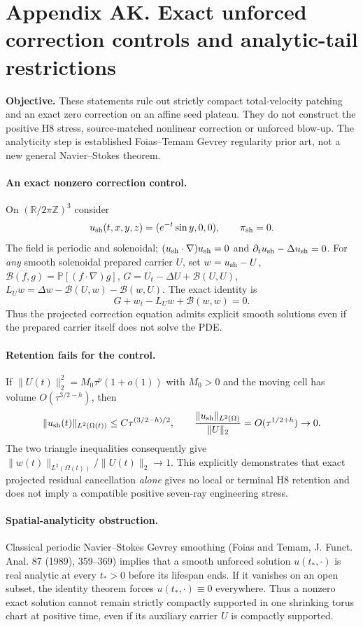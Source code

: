 \clearpage
\section*{Appendix AK. Exact unforced correction controls and analytic-tail restrictions}
\noindent\textbf{Objective.} These statements rule out strictly compact total-velocity patching and an exact zero correction on an affine seed plateau. They do not construct the positive H8 stress, source-matched nonlinear correction or unforced blow-up. The analyticity step is established Foias--Temam Gevrey regularity prior art, not a new general Navier--Stokes theorem.

\paragraph{An exact nonzero correction control.}
On $(\mathbb R/2\pi\mathbb Z)^3$ consider
\[
u_{\rm sh}(t,x,y,z)=(e^{-t}\sin y,0,0),\qquad \pi_{\rm sh}=0.
\]
The field is periodic and solenoidal; $(u_{\rm sh}\cdot\nabla)u_{\rm sh}=0$ and $\partial_tu_{\rm sh}-\Delta u_{\rm sh}=0$. For \emph{any} smooth solenoidal prepared carrier $U$, set $w=u_{\rm sh}-U$, $\mathcal B(f,g)=\mathbb P[(f\cdot\nabla)g]$,
$G=U_t-\Delta U+\mathcal B(U,U)$, $L_Uw=\Delta w-\mathcal B(U,w)-\mathcal B(w,U)$. The exact identity is
\[
\boxed{G+w_t-L_Uw+\mathcal B(w,w)=0.}
\]
Thus the projected correction equation admits explicit smooth solutions even if the prepared carrier itself does not solve the PDE.

\paragraph{Retention fails for the control.}
If $\|U(t)\|_2^2=M_0\tau^{p}(1+o(1))$ with $M_0>0$ and the moving cell has volume $O(\tau^{3/2-h})$, then
\[
\|u_{\rm sh}(t)\|_{L^2(\Omega(t))}\le C\tau^{(3/2-h)/2},
\qquad
\frac{\|u_{\rm sh}\|_{L^2(\Omega)}}{\|U\|_2}
=O(\tau^{1/2+h})\to0.
\]
The two triangle inequalities consequently give
$\|w(t)\|_{L^2(\Omega(t))}/\|U(t)\|_2\to1$.
This explicitly demonstrates that exact projected residual cancellation \emph{alone} gives no local or terminal H8 retention and does not imply a compatible positive seven-ray engineering stress.

\paragraph{Spatial-analyticity obstruction.}
Classical periodic Navier--Stokes Gevrey smoothing (Foias and Temam, J. Funct. Anal. 87 (1989), 359--369) implies that a smooth unforced solution $u(t_*,\cdot)$ is real analytic at every $t_*>0$ before its lifespan ends. If it vanishes on an open subset, the identity theorem forces $u(t_*,\cdot)\equiv0$ everywhere. Thus a nonzero exact solution cannot remain strictly compactly supported in one shrinking torus chart at positive time, even if its auxiliary carrier $U$ is compactly supported.


